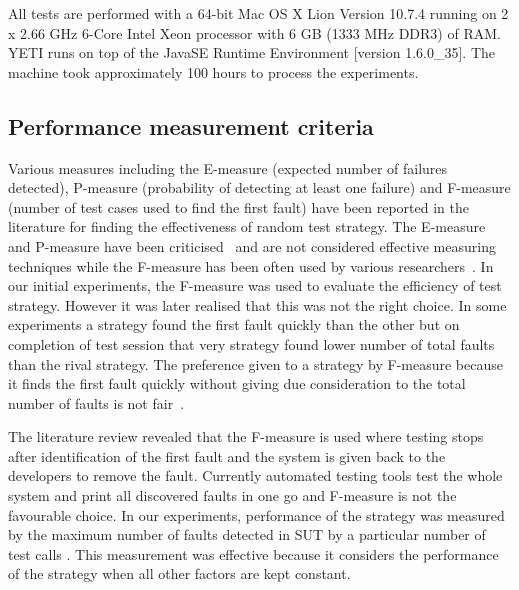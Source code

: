 All tests are performed with a 64-bit Mac OS X Lion Version 10.7.4 running on 2 x 2.66 GHz 6-Core Intel Xeon processor with 6 GB (1333 MHz DDR3) of RAM. YETI runs on top of the Java\texttrademark  SE Runtime Environment [version 1.6.0\_35]. The machine took approximately 100 hours to process the experiments.


\subsection{Performance measurement criteria}
Various measures including the E-measure (expected number of failures detected), P-measure (probability of detecting at least one failure) and F-measure (number of test cases used to find the first fault) have been reported in the literature for finding the effectiveness of random test strategy. The E-measure and P-measure have been criticised~\cite{chen2005adaptive} and are not considered effective measuring techniques while the F-measure has been often used by various researchers~\cite{chen2004statistical, chen1996expected}. In our initial experiments, the F-measure was used to evaluate the efficiency of test strategy. However it was later realised that this was not the right choice. In some experiments a strategy found the first fault quickly than the other but on completion of test session that very strategy found lower number of total faults than the rival strategy. The preference given to a strategy by F-measure because it finds the first fault quickly without giving due consideration to the total number of faults is not fair~\cite{liu2012comparison}.


  
The literature review revealed that the F-measure is used where testing stops after identification of the first fault and the system is given back to the developers to remove the fault. Currently automated testing tools test the whole system and print all discovered faults in one go and F-measure is not the favourable choice. In our experiments, performance of the strategy was measured by the maximum number of faults detected in SUT by a particular number of test calls \cite{ciupa2007experimental, pacheco2007feedback, ciupa2008predictability}. This measurement was effective because it considers the performance of the strategy when all other factors are kept constant.

